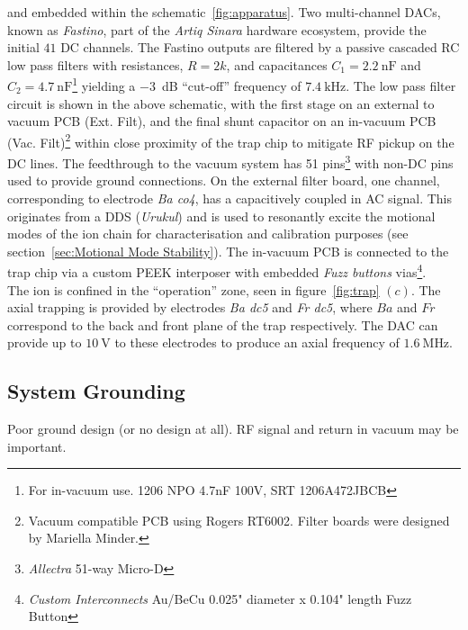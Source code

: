     \noindent and embedded within the schematic~\ref{fig:apparatus}. Two
    multi-channel DACs, known as \emph{Fastino}, part of the \emph{Artiq Sinara} hardware
    ecosystem, provide the initial $41$ DC channels. 
    The Fastino outputs are filtered by a passive cascaded RC low pass filters with resistances, $R=2k$, and capacitances $C_1 = 2.2~\unit{\nano\farad}$ and $C_2 = 4.7~\unit{\nano\farad}$\footnote{For in-vacuum use. 1206 NPO 4.7nF 100V, SRT 1206A472JBCB} yielding a $-3$~dB ``cut-off'' frequency of $7.4~\unit{\kilo\hertz}$. The low pass filter circuit is shown in the above schematic, with the first stage on an external to vacuum PCB (Ext. Filt), and the 
    final shunt capacitor on an in-vacuum PCB (Vac. Filt)\footnote{Vacuum compatible PCB using Rogers RT6002. Filter boards were designed by Mariella Minder.} within close proximity of the trap chip to mitigate RF pickup on the DC lines. The feedthrough to the vacuum system has 51 pins\footnote{\emph{Allectra} 51-way Micro-D} with non-DC pins used to provide ground connections.
    On the external filter board, one channel, corresponding to electrode \textit{Ba co4}, has a capacitively coupled in AC signal. This originates from a DDS (\emph{Urukul}) and is used to resonantly excite the motional modes of the ion chain for characterisation and calibration purposes (see section~\ref{sec:Motional Mode Stability}).
    The in-vacuum PCB is connected to the trap chip via a custom PEEK interposer with embedded \emph{Fuzz buttons} vias\footnote{\emph{Custom Interconnects} Au/BeCu 0.025" diameter x 0.104" length Fuzz Button}.\\
    The ion is confined in the ``operation'' zone, seen in
    figure~\ref{fig:trap} $(c)$. The axial trapping is provided by electrodes
    \textit{Ba dc5} and \textit{Fr dc5}, where $Ba$ and $Fr$ correspond to the back and front plane of the trap respectively.
    The DAC can provide up to $10~\unit{\volt}$ to these electrodes to produce an axial frequency of $1.6~\unit{\mega\hertz}$.

\subsection{System Grounding}
    Poor ground design (or no design at all).
    RF signal and return in vacuum may be important.
 
